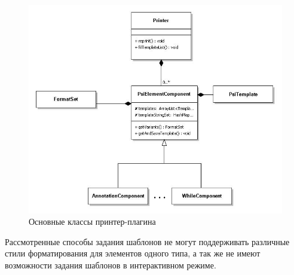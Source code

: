 \begin{figure}[h!]
	\centering
	\includegraphics[width=\textwidth]{Ozernykh/images/hierarchyPP}
	\caption{Основные классы принтер-плагина}
	\label{fig:hierarchyPP}
\end{figure}

Рассмотренные способы задания шаблонов не могут поддерживать различные стили форматирования для элементов одного типа, а так же не имеют возможности задания шаблонов в интерактивном режиме. 

